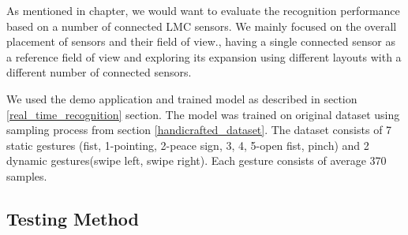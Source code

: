 As mentioned in  chapter, we would want to evaluate the recognition performance based on a number of connected LMC sensors. We mainly focused on the overall placement of sensors and their field of view., having a single connected sensor as a reference field of view and exploring its expansion using different layouts with a different number of connected sensors. 

We used the demo application and trained model as described in section \ref{real_time_recognition} section. The model was trained on original dataset using sampling process from section \ref{handicrafted_dataset}. The dataset consists of 7 static gestures (fist, 1-pointing, 2-peace sign, 3, 4, 5-open fist, pinch) and 2 dynamic gestures(swipe left, swipe right). Each gesture consists of average 370 samples.

\subsection{Testing Method}